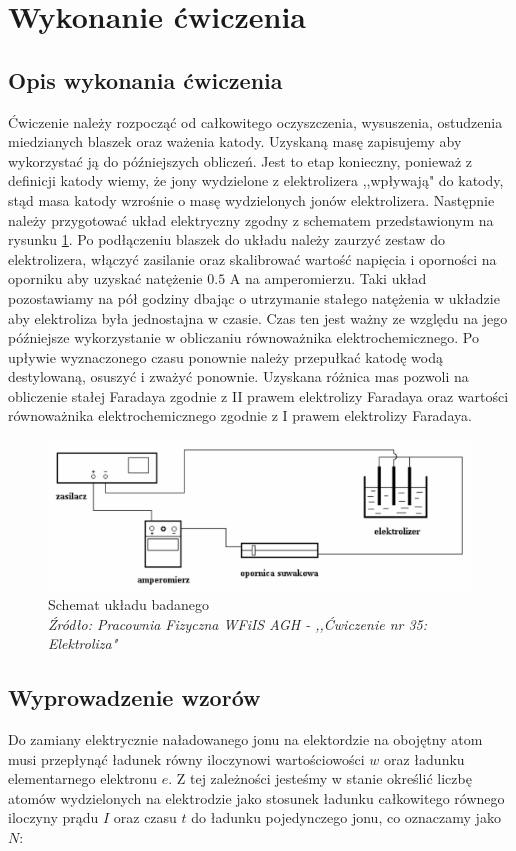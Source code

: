 \documentclass[a4paper,12pts]{article}
\begin{document}
	\newpage
	\section{Wykonanie ćwiczenia}
	\subsection{Opis wykonania ćwiczenia}
	Ćwiczenie należy rozpocząć od całkowitego oczyszczenia, wysuszenia, ostudzenia miedzianych blaszek oraz ważenia katody. Uzyskaną masę zapisujemy aby wykorzystać ją do późniejszych obliczeń. Jest to etap konieczny, ponieważ z definicji katody wiemy, że jony wydzielone z elektrolizera ,,wpływają" do katody, stąd masa katody wzrośnie o masę wydzielonych jonów elektrolizera. Następnie należy przygotować układ elektryczny zgodny z schematem przedstawionym na rysunku \ref{schemat_ukladu}. Po podłączeniu blaszek do układu należy zaurzyć zestaw do elektrolizera, włączyć zasilanie oraz skalibrować wartość napięcia i oporności na oporniku aby uzyskać natężenie $0.5$ A na amperomierzu. Taki układ pozostawiamy na pół godziny dbając o utrzymanie stałego natężenia w układzie aby elektroliza była jednostajna w czasie. Czas ten jest ważny ze względu na jego późniejsze wykorzystanie w obliczaniu równoważnika elektrochemicznego. Po upływie wyznaczonego czasu ponownie należy przepułkać katodę wodą destylowaną, osuszyć i zważyć ponownie. Uzyskana różnica mas pozwoli na obliczenie stałej Faradaya zgodnie z II prawem elektrolizy Faradaya oraz wartości równoważnika elektrochemicznego zgodnie z I prawem elektrolizy Faradaya.

	
	\begin{figure}[!h]
		\centering
		\includegraphics[scale=0.6]{schemat.png}
		\caption{Schemat układu badanego \\ \textit{Źródło: Pracownia Fizyczna WFiIS AGH - ,,Ćwiczenie nr 35: Elektroliza"}}
		\label{schemat_ukladu}
	\end{figure}

	\subsection{Wyprowadzenie wzorów}
	Do zamiany elektrycznie naładowanego jonu na elektordzie na obojętny atom musi przepłynąć ładunek równy iloczynowi wartościowości $w$ oraz ładunku elementarnego elektronu $e$. Z tej zależności jesteśmy w stanie określić liczbę atomów wydzielonych na elektrodzie jako stosunek ładunku całkowitego równego iloczyny prądu $I$ oraz czasu $t$ do ładunku pojedynczego jonu, co oznaczamy jako $N$:
	
\end{document}
